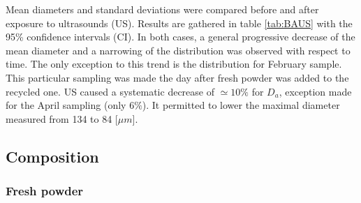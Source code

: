 Mean diameters and standard deviations were compared before and after exposure to ultrasounds (US). Results are gathered in table \ref{tab:BAUS} with the 95\% confidence intervals (CI). In both cases, a general progressive decrease of the mean diameter and a narrowing of the distribution was observed with respect to time. The only exception to this trend is the distribution for February sample. This particular sampling was made the day after fresh powder was added to the recycled one. US caused a systematic decrease of $\simeq 10\%$ for $D_a$, exception made for the April sampling (only $6\%$). It permitted to lower the maximal diameter measured from 134 to 84 [$\mu m$].  \\

 \begin{center}
\begin{table}[ht]
\noindent{}

\caption[Average powder diameter and standard deviation before and after ultrasonic treatment]{Average powder diameter and standard deviation before and after ultrasonic treatment}
\label{tab:BAUS}
\end{table}
 \end{center}

\subsection{Composition}

\subsubsection{Fresh powder}

